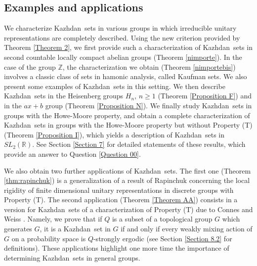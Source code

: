 \documentclass[11pt,english,a4paper]{smfart}
\numberwithin{equation}{section}
\theoremstyle{definition}
\begin{document}
\subsection{Examples and applications}
We characterize {Kazhdan}\ sets in various groups in which irreducible unitary representations are completely described. Using the new criterion provided by Theorem \ref{Theorem 2}, we first provide such a characterization of {Kazhdan}\ sets in second countable locally compact abelian groups (Theorem \ref{nimporte}). In the case of the group ${\ensuremath{\mathbb Z}}$, the characterization we obtain (Theorem \ref{nimportebis}) involves a classic class of sets in hamonic analysis, called Kaufman sets. We also present some examples of {Kazhdan}\ sets in this setting. We then describe {Kazhdan}\ sets in the Heisenberg groups $H_{n}$, $n\ge  1$ (Theorem \ref{Proposition F}) and in the $ax+b$ group (Theorem \ref{Proposition N}). We finally study {Kazhdan}\ sets in groups with the Howe-Moore property, and obtain a complete characterization of {Kazhdan}\ sets in groups with the Howe-Moore property but without Property (T) (Theorem \ref{Proposition I}), which yields a 
description of {Kazhdan}\ sets in $SL_{2}({\ensuremath{\mathbb R}})$. See Section \ref{Section 7} for detailed statements of these results, which provide an answer to Question \ref{Question 00}.
\par\smallskip
We also obtain two further applications of {Kazhdan}\ sets. The first one (Theorem \ref{thm:rapinchuk}) is a generalization of a result of Rapinchuk \cite{rapin} concerning the local rigidity of finite dimensional unitary representations in discrete groups with Property (T).
The second application (Theorem \ref{Theorem AA}) consists in a version for {Kazhdan}\ sets of a characterization of Property (T) due to Connes and Weiss \cite{CW}. Namely, we prove that if $Q$
is a subset of a topological group $G$ which generates $G$, it is a {Kazhdan}\ set in $G$ if and only if every weakly mixing action of $G$ on a probability space is $Q$-strongly ergodic (see Section \ref{Section 8.2} 
for definitions). These applications highlight one more time the importance of determining {Kazhdan}\ sets in general groups.
\end{document}
